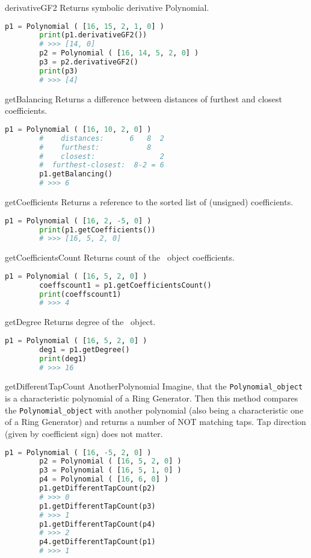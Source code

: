  {derivativeGF2} {} {
	Returns symbolic derivative Polynomial.
}
\begin{lstlisting}[language=Python]
		p1 = Polynomial ( [16, 15, 2, 1, 0] )
		print(p1.derivativeGF2())
		# >>> [14, 0]
		p2 = Polynomial ( [16, 14, 5, 2, 0] )
		p3 = p2.derivativeGF2()
		print(p3)
		# >>> [4]
\end{lstlisting}

\label{polynomial:getbalancing}
 {getBalancing} {} {
	Returns a difference between distances of furthest and closest coefficients.
}
\begin{lstlisting}[language=Python]
		p1 = Polynomial ( [16, 10, 2, 0] )
		#    distances:      6   8  2
		#    furthest:           8
		#    closest:               2
		#  furthest-closest:  8-2 = 6
		p1.getBalancing()
		# >>> 6
\end{lstlisting}

 {getCoefficients} {} {
	Returns a reference to the sorted list of (unsigned) coefficients.
}
\begin{lstlisting}[language=Python]
		p1 = Polynomial ( [16, 2, -5, 0] )
		print(p1.getCoefficients())
		# >>> [16, 5, 2, 0]
\end{lstlisting}

 {getCoefficientsCount} {} {
	Returns count of the \Polynomial\ object coefficients.
}
\begin{lstlisting}[language=Python]
		p1 = Polynomial ( [16, 5, 2, 0] )
		coeffscount1 = p1.getCoefficientsCount()
		print(coeffscount1)
		# >>> 4
\end{lstlisting}

 {getDegree} {} {
	Returns degree of the \Polynomial\ object.
}
\begin{lstlisting}[language=Python]
		p1 = Polynomial ( [16, 5, 2, 0] )
		deg1 = p1.getDegree()
		print(deg1)
		# >>> 16
\end{lstlisting}

 {getDifferentTapCount} {AnotherPolynomial} {
	Imagine, that the \texttt{Polynomial\_object} is a characteristic polynomial of a Ring Generator. Then this method compares the \texttt{Polynomial\_object} with another polynomial (also being a characteristic one of a Ring Generator) and returns a number of NOT matching taps. Tap direction (given by coefficient sign) does not matter.
}
\begin{lstlisting}[language=Python]
		p1 = Polynomial ( [16, -5, 2, 0] )
		p2 = Polynomial ( [16, 5, 2, 0] )
		p3 = Polynomial ( [16, 5, 1, 0] )
		p4 = Polynomial ( [16, 6, 0] )
		p1.getDifferentTapCount(p2)
		# >>> 0
		p1.getDifferentTapCount(p3)
		# >>> 1
		p1.getDifferentTapCount(p4)
		# >>> 2
		p4.getDifferentTapCount(p1)
		# >>> 1
\end{lstlisting}

